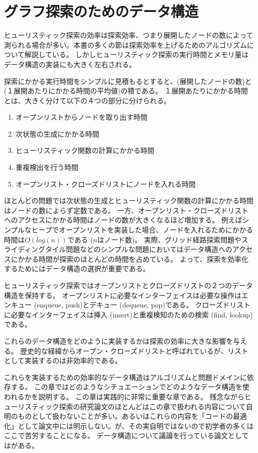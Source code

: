 \chapter{グラフ探索のためのデータ構造}
\label{ch:search-performance}

ヒューリスティック探索の効率は探索効率、つまり展開したノードの数によって測られる場合が多い。本書の多くの節は探索効率を上げるためのアルゴリズムについて解説している。
しかしヒューリスティック探索の実行時間とメモリ量はデータ構造の実装にも大きく左右される。


探索にかかる実行時間をシンプルに見積もるとすると、(展開したノードの数)と(１展開あたりにかかる時間の平均値)の積である。
１展開あたりにかかる時間とは、大きく分けて以下の４つの部分に分けられる。

\begin{enumerate}
	\item オープンリストからノードを取り出す時間
	\item 次状態の生成にかかる時間
	\item ヒューリスティック関数の計算にかかる時間
	\item 重複検出を行う時間
	\item オープンリスト・クローズドリストにノードを入れる時間
\end{enumerate}

ほとんどの問題では次状態の生成とヒューリスティック関数の計算にかかる時間はノードの数によらず定数である。
一方、オープンリスト・クローズドリストへのアクセスにかかる時間はノードの数が大きくなるほど増加する。
例えばシンプルなヒープでオープンリストを実装した場合、ノードを入れるためにかかる時間は$O(log (n))$である ($n$はノード数)。
実際、グリッド経路探索問題やスライディングタイル問題などのシンプルな問題においてはデータ構造へのアクセスにかかる時間が探索のほとんどの時間を占めている。
よって、探索を効率化するためにはデータ構造の選択が重要である。

ヒューリスティック探索ではオープンリストとクローズドリストの２つのデータ構造を保持する。
オープンリストに必要なインターフェイスは必要な操作はエンキュー (enqueue, push)とデキュー (dequeue, pop)である。
クローズドリストに必要なインターフェイスは挿入 (insert)と重複検知のための検索 (find, lookup)である。

これらのデータ構造をどのように実装するかは探索の効率に大きな影響を与える。
歴史的な経緯からオープン・クローズドリストと呼ばれているが、リストとして実装するのは非効率的である。

これらを実装するための効率的なデータ構造はアルゴリズムと問題ドメインに依存する。
この章ではどのようなシチュエーションでどのようなデータ構造を使われるかを説明する。
この章は実践的に非常に重要な章である。
残念ながらヒューリスティック探索の研究論文のほとんどはこの章で扱われる内容について自明のものとして扱わないことが多い。あるいはこれらの内容を「コードの最適化」として論文中には明示しない。が、その実自明ではないので初学者の多くはここで苦労することになる。
データ構造について議論を行っている論文としては\cite{burns2012implementing}がある。


